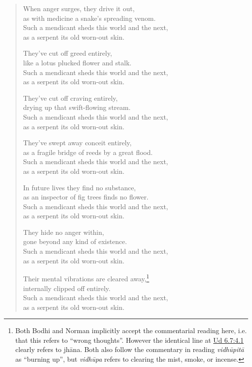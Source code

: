 \documentclass[12pt,openany]{book}%
\begin{document}
\begin{verse}%
When anger surges, they drive it out, \\
as with medicine a snake’s spreading venom. \\
Such a mendicant sheds this world and the next, \\
as a serpent its old worn-out skin. 

They’ve cut off greed entirely, \\
like a lotus plucked flower and stalk. \\
Such a mendicant sheds this world and the next, \\
as a serpent its old worn-out skin. 

They’ve cut off craving entirely, \\
drying up that swift-flowing stream. \\
Such a mendicant sheds this world and the next, \\
as a serpent its old worn-out skin. 

They’ve swept away conceit entirely, \\
as a fragile bridge of reeds by a great flood. \\
Such a mendicant sheds this world and the next, \\
as a serpent its old worn-out skin. 

In future lives they find no substance, \\
as an inspector of fig trees finds no flower. \\
Such a mendicant sheds this world and the next, \\
as a serpent its old worn-out skin. 

They hide no anger within, \\
gone beyond any kind of existence. \\
Such a mendicant sheds this world and the next, \\
as a serpent its old worn-out skin. 

Their mental vibrations are cleared away,\footnote{Both Bodhi and Norman implicitly accept the commentarial reading here, i.e. that this refers to “wrong thoughts”. However the identical line at \href{https://suttacentral.net/ud6.7/en/sujato\#4.1}{Ud 6.7:4.1} clearly refers to \textsanskrit{jhāna}. Both also follow the commentary in reading \textit{\textsanskrit{vidhūpitā}} as “burning up”, but \textit{\textsanskrit{vidhūpa}} refers to clearing the mist, smoke, or incense. } \\
internally clipped off entirely. \\
Such a mendicant sheds this world and the next, \\
as a serpent its old worn-out skin. 


\end{verse}
\end{document}
